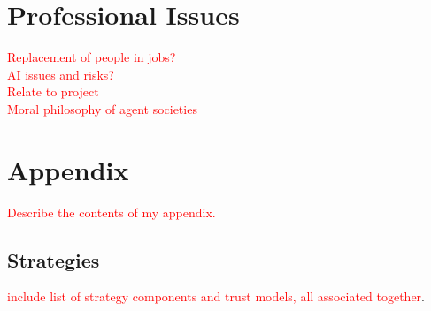 \documentclass[]{final_report}
\begin{document}
\newpage
{}

\label{endpage}

\chapter{Professional Issues}
\textcolor{red}{Replacement of people in jobs?\\
AI issues and risks?\\
Relate to project\\
Moral philosophy of agent societies}

\chapter{Appendix}
\label{appendix}
\textcolor{red}{Describe the contents of my appendix.}
\section{Strategies}
\label{appendix:strats}
\textcolor{red}{include list of strategy components and trust models, all associated together}.

%

%

%

%	
	
\end{document}
